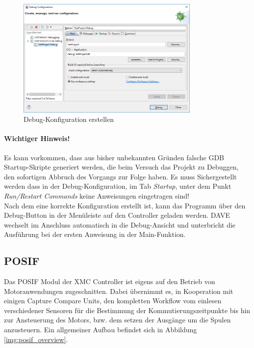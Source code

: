 \begin{figure}[h]
\centering
\includegraphics[width=0.8\textwidth]{sensor/dave_debugConfig.PNG}
\caption{Debug-Konfiguration erstellen}
\label{img:dave_debugConfig}
\end{figure}

\paragraph{Wichtiger Hinweis!} Es kann vorkommen, dass aus bisher unbekannten Gründen falsche GDB Startup-Skripte generiert werden, die beim Versuch das Projekt zu Debuggen, den sofortigen Abbruch des Vorgangs zur Folge haben. Es muss Sichergestellt werden dass in der Debug-Konfiguration, im Tab \textit{Startup}, unter dem Punkt \textit{Run/Restart Commands} keine Anweisungen eingetragen sind! \\

\noindent
Nach dem eine korrekte Konfiguration erstellt ist, kann das Programm über den Debug-Button in der Menüleiste auf den Controller geladen werden. DAVE wechselt im Anschluss automatisch in die Debug-Ansicht und unterbricht die Ausführung bei der ersten Anweisung in der Main-Funktion.

\subsection{POSIF}
\label{lbl:sensor_posif}
Das POSIF Modul der XMC Controller ist eigens auf den Betrieb von Motoranwendungen zugeschnitten. Dabei übernimmt es, in Kooperation mit einigen Capture Compare Units, den kompletten Workflow vom einlesen verschiedener Sensoren für die Bestimmung der Kommutierungszeitpunkte bis hin zur Ansteuerung des Motors, bzw. dem setzen der Ausgänge um die Spulen anzusteuern. Ein allgemeiner Aufbau befindet sich in Abbildung \ref{img:posif_overview}.

